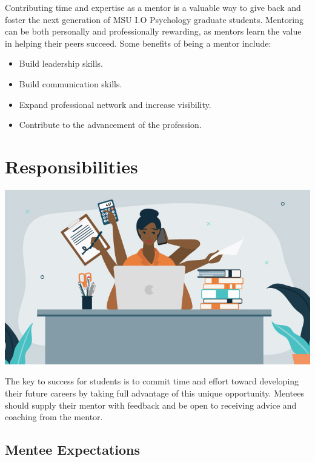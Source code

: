 \documentclass[
  openany]{book}
\providecommand{\tightlist}{%
  \setlength{\itemsep}{0pt}\setlength{\parskip}{0pt}}
\begin{document}
Contributing time and expertise as a mentor is a valuable way to give back and foster the next generation of MSU I.O Psychology graduate students. Mentoring can be both personally and professionally rewarding, as mentors learn the value in helping their peers succeed. Some benefits of being a mentor include:

\begin{itemize}
\tightlist
\item
  Build leadership skills.
\item
  Build communication skills.
\item
  Expand professional network and increase visibility.
\item
  Contribute to the advancement of the profession.
\end{itemize}

\hypertarget{responsibilities}{%
\chapter{Responsibilities}\label{responsibilities}}

\includegraphics{images/responsibility.jpg}

The key to success for students is to commit time and effort toward developing their future careers by taking full advantage of this unique opportunity. Mentees should supply their mentor with feedback and be open to receiving advice and coaching from the mentor.

\hypertarget{mentee-expectations}{%
\section{Mentee Expectations}\label{mentee-expectations}}
\end{document}
